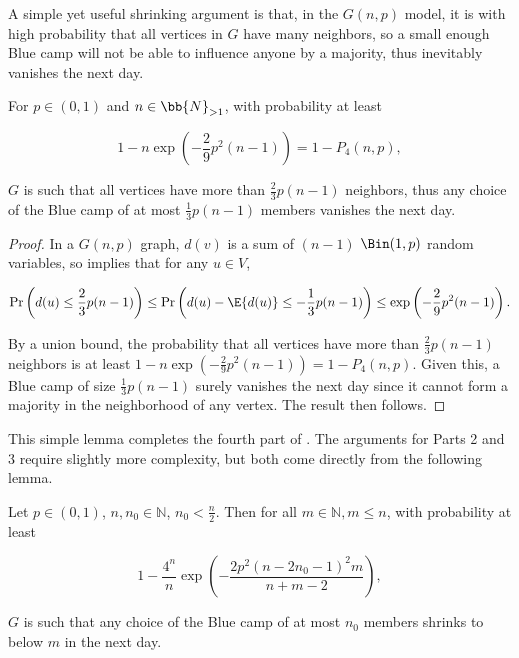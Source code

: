 \documentclass{toc}
\begin{document}
			A simple yet useful shrinking argument is that, in the $G(n, p)$ model,  it is with high probability that all vertices in $G$ have many neighbors, so a small enough Blue camp will not be able to influence anyone by a majority, thus inevitably vanishes the next day.
			
			\begin{lemma} \label{prop:uni-large-linear-advantage}
				For $p\in (0, 1)$ and $n\in \bb{N}_{>1}$, with probability at least
				\begin{linenomath}\begin{equation*}
						1 - n \exp\left(-\frac{2}{9}p^2(n-1)\right) = 1 - P_4(n, p),
				\end{equation*}\end{linenomath}
				$G$ is such that all vertices have more than $\frac{2}{3}p(n - 1)$ neighbors, thus any choice of the Blue camp of at most $\frac{1}{3}p(n - 1)$ members vanishes the next day.
			\end{lemma}
			
			\begin{proof}
				In a $G(n, p)$ graph, $d(v)$ is a sum of $(n-1)$ $\Bin(1, p)$ random variables, so  implies that for any $u\in V$,
				\begin{linenomath}\begin{equation*}
						\Pr\left(d(u)\le \frac{2}{3}p(n-1)\right)
						\le \Pr\left(d(u) - \E{d(u)} \le -\frac{1}{3}p(n-1)\right) \le \exp\left(-\frac{2}{9}p^2(n-1)\right).
				\end{equation*}\end{linenomath}
				By a union bound, the probability that all vertices have more than $\frac{2}{3}p(n-1)$ neighbors is at least $1 - n\exp\left(-\frac{2}{9}p^2(n-1)\right) = 1 - P_4(n, p)$. Given this, a Blue camp of size $\frac{1}{3}p(n-1)$ surely vanishes the next day since it cannot form a majority in 
				the neighborhood of any vertex.  %
				The result then follows.
			\end{proof}
			
			This simple lemma completes the fourth part of .
			The arguments for Parts 2 and 3 require slightly more complexity, but both come directly from the following lemma.
			
			
			
			\begin{lemma} \label{lem:uni-bad-set-bound}
				Let $p\in (0, 1)$, $n, n_0 \in \mathbb{N}$, $n_0 < \frac{n}{2}$. Then for all $m\in \mathbb{N}, m\le n$, with probability at least
				\begin{linenomath}\begin{equation*}
						1 - \frac{4^n}{n} \exp\left(-\frac{2p^2(n - 2n_0 - 1)^2m}{n + m - 2} \right),
				\end{equation*}\end{linenomath}
				$G$ is such that any choice of the Blue camp of at most $n_0$ members shrinks to below $m$ in the next day.
			\end{lemma}
			
\end{document}
